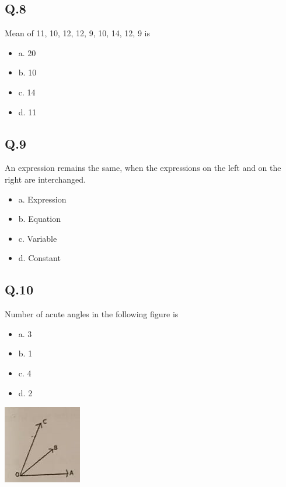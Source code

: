 \documentclass[11pt]{article}
\begin{document}
\subsection*{Q.8}
\label{sec:org6064a78}
Mean of 11, 10, 12, 12, 9, 10, 14, 12, 9 is
\begin{itemize}
\item a. 20
\item b. 10
\item c. 14
\item d. 11
\end{itemize}
\subsection*{Q.9}
\label{sec:orgea7cc87}
An expression remains the same, when the expressions on the left and on the right are interchanged.
\begin{itemize}
\item a. Expression
\item b. Equation
\item c. Variable
\item d. Constant
\end{itemize}
\subsection*{Q.10}
\label{sec:org9bfa11d}
Number of acute angles in the following figure is
\begin{itemize}
\item a. 3
\item b. 1
\item c. 4
\item d. 2
\end{itemize}
\begin{center}
\includegraphics[width=.9\linewidth]{./maths10.png}
\end{center}
\end{document}
